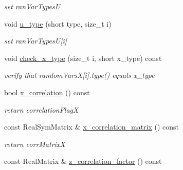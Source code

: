 \begin{DoxyCompactItemize}
\begin{DoxyCompactList}\small\item\em set ran\+Var\+TypesU \end{DoxyCompactList}\item 
void \hyperlink{classPecos_1_1ProbabilityTransformation_a740407b90a68c2b5deae3cabff564ea6}{u\+\_\+type} (short type, size\+\_\+t i)\label{classPecos_1_1ProbabilityTransformation_a740407b90a68c2b5deae3cabff564ea6}

\begin{DoxyCompactList}\small\item\em set ran\+Var\+TypesU\mbox{[}i\mbox{]} \end{DoxyCompactList}\item 
void \hyperlink{classPecos_1_1ProbabilityTransformation_a0ef89684a004194a680217933811a70c}{check\+\_\+x\+\_\+type} (size\+\_\+t i, short x\+\_\+type) const \label{classPecos_1_1ProbabilityTransformation_a0ef89684a004194a680217933811a70c}

\begin{DoxyCompactList}\small\item\em verify that random\+VarsX\mbox{[}i\mbox{]}.type() equals x\+\_\+type \end{DoxyCompactList}\item 
bool \hyperlink{classPecos_1_1ProbabilityTransformation_a2229b5f1ca73e4e32b2144cfa1340264}{x\+\_\+correlation} () const \label{classPecos_1_1ProbabilityTransformation_a2229b5f1ca73e4e32b2144cfa1340264}

\begin{DoxyCompactList}\small\item\em return correlation\+FlagX \end{DoxyCompactList}\item 
const Real\+Sym\+Matrix \& \hyperlink{classPecos_1_1ProbabilityTransformation_a3296724f95bc3b148a8220e17fa52e73}{x\+\_\+correlation\+\_\+matrix} () const \label{classPecos_1_1ProbabilityTransformation_a3296724f95bc3b148a8220e17fa52e73}

\begin{DoxyCompactList}\small\item\em return corr\+MatrixX \end{DoxyCompactList}\item 
const Real\+Matrix \& \hyperlink{classPecos_1_1ProbabilityTransformation_a362101239d2ea85708df831957e6e2a5}{z\+\_\+correlation\+\_\+factor} () const \label{classPecos_1_1ProbabilityTransformation_a362101239d2ea85708df831957e6e2a5}


\end{DoxyCompactItemize}
